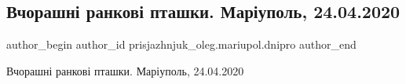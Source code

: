  
 
 
 
 

\subsection{Вчорашні ранкові пташки. Маріуполь, 24.04.2020}
\label{sec:25_04_2020.fb.prisjazhnjuk_oleg.mariupol.dnipro.1.rankovi_ptashky}

\ifcmt
 author_begin
   author_id prisjazhnjuk_oleg.mariupol.dnipro
 author_end
\fi

Вчорашні ранкові пташки. Маріуполь, 24.04.2020

